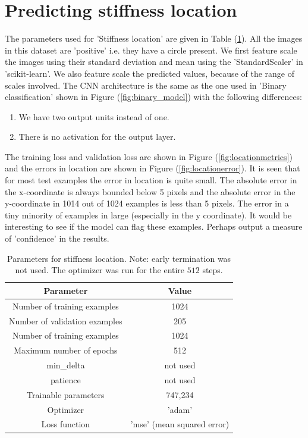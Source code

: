 \documentclass{article}
\begin{document}
\section{Predicting stiffness location}
%
The parameters used for 'Stiffness location' are given in Table (\ref{tab:stifflocparam}). All the images in this dataset are 'positive' i.e. they have a circle present. We first feature scale the images using their standard deviation and mean using the 'StandardScaler' in 'scikit-learn'. We also feature scale the predicted values, because of the range of scales involved. The CNN architecture is the same as the one used in 'Binary classification' shown in Figure (\ref{fig:binary_model}) with the following differences:
\begin{enumerate}
\item{We have two output units instead of one.}
\item{There is no activation for the output layer.}
\end{enumerate}
The training loss and validation loss are shown in Figure (\ref{fig:locationmetrics}) and the errors in location are shown in Figure (\ref{fig:locationerror}). It is seen that for most test examples the error in location is quite small. The absolute error in the x-coordinate is always bounded below 5 pixels and the absolute error in the y-coordinate in 1014 out of 1024 examples is less than 5 pixels. The error in a tiny minority of examples in large (especially in the y coordinate). It would be interesting to see if the model can flag these examples. Perhaps output a measure of 'confidence' in the results.
\begin{table}
  \centering
  \begin{tabular}{|c|c|}
    \hline
    Parameter & Value \\
    \hline
    Number of training examples   & 1024 \\
    Number of validation examples & 205 \\
    Number of training examples   & 1024 \\
    Maximum number of epochs      & 512 \\
    min{\_}delta      & not used\\
    patience                      & not used  \\
    Trainable parameters          & 747,234\\
    Optimizer         & 'adam'     \\
    Loss function     & 'mse' (mean squared error) \\
    \hline
  \end{tabular}
  \caption{\label{tab:stifflocparam} Parameters for stiffness location. Note: early termination was not used. The optimizer was run for the entire $512$ steps.}
\end{table}
\end{document}
